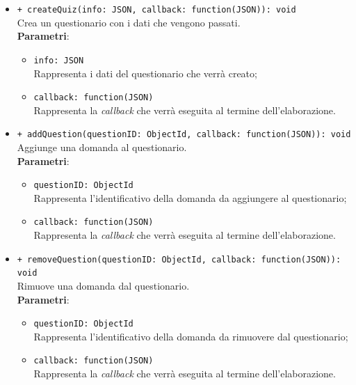 \begin{itemize}
\begin{itemize}
			\item \texttt{+ createQuiz(info: JSON, callback: function(JSON)): void}\\
			Crea un questionario con i dati che vengono passati.\\
			\textbf{Parametri}:
			\begin{itemize}
				\item \texttt{info: JSON}\\
				Rappresenta i dati del questionario che verrà creato;
				\item \texttt{callback: function(JSON)}\\
				Rappresenta la \textit{callback} che verrà eseguita al termine dell'elaborazione.
			\end{itemize}
			
			\item \texttt{+ addQuestion(questionID: ObjectId,  callback: function(JSON)): void}\\
			Aggiunge una domanda al questionario.\\
			\textbf{Parametri}:
			\begin{itemize}
				\item \texttt{questionID: ObjectId}\\
				Rappresenta l'identificativo della domanda da aggiungere al questionario;
				\item \texttt{callback: function(JSON)}\\
				Rappresenta la \textit{callback} che verrà eseguita al termine dell'elaborazione.
			\end{itemize}
			
			\item \texttt{+ removeQuestion(questionID: ObjectId, callback: function(JSON)): void}\\
			Rimuove una domanda dal questionario.\\
			\textbf{Parametri}:
			\begin{itemize}
				\item \texttt{questionID: ObjectId}\\
				Rappresenta l'identificativo della domanda da rimuovere dal questionario;
				\item \texttt{callback: function(JSON)}\\
				Rappresenta la \textit{callback} che verrà eseguita al termine dell'elaborazione.
			\end{itemize}
			

\end{itemize}
\end{itemize}

